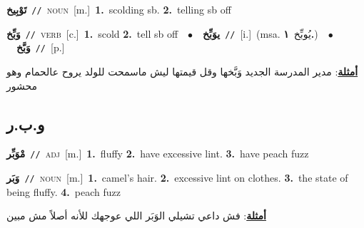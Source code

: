 \documentclass[10pt,a4paper,twoside]{article} %
\begin{document}
\begin{multicols}{2}
{{\setlength\topsep{0pt}\textbf{\foreignlanguage{arabic}{تَوْبِيخ}}\ {\color{gray}\texttt{//}\color{black}}\ \textsc{noun}\ [m.]\ \textbf{1.}~scolding sb.  \textbf{2.}~telling sb off\ 

{\setlength\topsep{0pt}\textbf{\foreignlanguage{arabic}{وَبِّخ}}\ {\color{gray}\texttt{//}\color{black}}\ \textsc{verb}\ [c.]\ \textbf{1.}~scold  \textbf{2.}~tell sb off\ \ $\bullet$\ \ \setlength\topsep{0pt}\textbf{\foreignlanguage{arabic}{يوَبِّخ}}\ {\color{gray}\texttt{//}\color{black}}\ [i.]\ \color{gray}(msa. \foreignlanguage{arabic}{يُوبِّخ}~\foreignlanguage{arabic}{\textbf{١.}})\color{black}\ \ $\bullet$\ \ \setlength\topsep{0pt}\textbf{\foreignlanguage{arabic}{وَبَّخ}}\ {\color{gray}\texttt{//}\color{black}}\ [p.]\  \begin{flushright}\color{gray}\foreignlanguage{arabic}{\textbf{\underline{\foreignlanguage{arabic}{أمثلة}}}: مدير المدرسة الجديد وَبَّخها وقل قيمتها ليش ماسمحت للولد يروح عالحمام وهو محشور}\end{flushright}\color{black}} \vspace{2mm}

\vspace{-3mm}
\subsection*{\color{blue}\foreignlanguage{arabic}{و.ب.ر}\color{blue}{}} 

{\setlength\topsep{0pt}\textbf{\foreignlanguage{arabic}{مْوَبِّر}}\ {\color{gray}\texttt{//}\color{black}}\ \textsc{adj}\ [m.]\ \textbf{1.}~fluffy  \textbf{2.}~have excessive lint.  \textbf{3.}~have peach fuzz\ 

{\setlength\topsep{0pt}\textbf{\foreignlanguage{arabic}{وَبَر}}\ {\color{gray}\texttt{//}\color{black}}\ \textsc{noun}\ [m.]\ \textbf{1.}~camel's hair.  \textbf{2.}~excessive lint on clothes.  \textbf{3.}~the state of being fluffy.  \textbf{4.}~peach fuzz\  \begin{flushright}\color{gray}\foreignlanguage{arabic}{\textbf{\underline{\foreignlanguage{arabic}{أمثلة}}}: فش داعي تشيلي الوَبَر اللي عوجهك للأنه أصلاً مش مبين}\end{flushright}\color{black}} \vspace{2mm}

}}}
\end{multicols}
\end{document}
